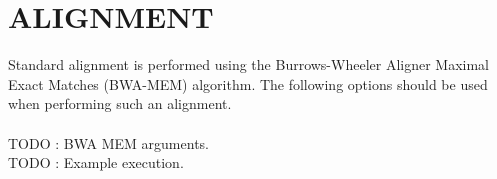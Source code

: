 \section{ALIGNMENT}
Standard alignment is performed using the Burrows-Wheeler Aligner Maximal Exact
Matches (BWA-MEM) algorithm. The following options should be used when
performing such an alignment. \\
\\
TODO : BWA MEM arguments. \\
TODO : Example execution. \\
